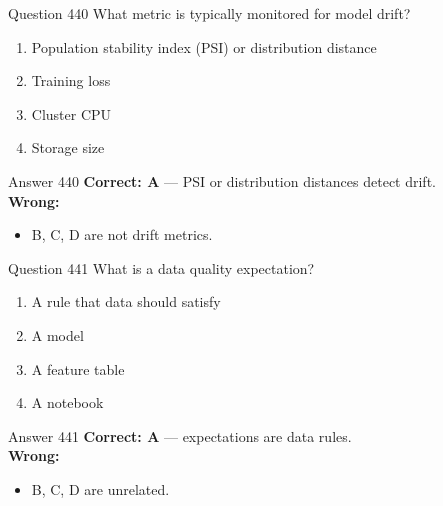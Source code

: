 \documentclass[aspectratio=169,11pt]{beamer}
\begin{document}
	\begin{frame}{Question 440}
		What metric is typically monitored for model drift?
		\begin{enumerate}[label=\Alph*.]
			\item Population stability index (PSI) or distribution distance
			\item Training loss
			\item Cluster CPU
			\item Storage size
		\end{enumerate}
	\end{frame}
	\begin{frame}{Answer 440}
		\textbf{Correct: A} --- PSI or distribution distances detect drift.\\
		\vspace{0.5em}
		\textbf{Wrong:}
		\begin{itemize}
			\item B, C, D are not drift metrics.
		\end{itemize}
	\end{frame}
	
	\begin{frame}{Question 441}
		What is a data quality expectation?
		\begin{enumerate}[label=\Alph*.]
			\item A rule that data should satisfy
			\item A model
			\item A feature table
			\item A notebook
		\end{enumerate}
	\end{frame}
	\begin{frame}{Answer 441}
		\textbf{Correct: A} --- expectations are data rules.\\
		\vspace{0.5em}
		\textbf{Wrong:}
		\begin{itemize}
			\item B, C, D are unrelated.
		\end{itemize}
	\end{frame}
	
\end{document}
